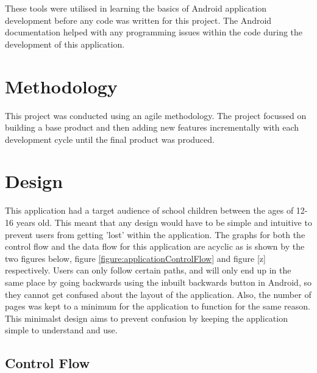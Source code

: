 \documentclass{article}
\begin{document}
These tools were utilised in learning the basics of Android application development before any code was written for this project. The Android documentation helped with any programming issues within the code during the development of this application. 

\section{Methodology}
\label{section:methodology}

This project was conducted using an agile methodology. The project focussed on building a base product and then adding new features incrementally with each development cycle until the final product was produced. 
























\section{Design}
\label{section:design}

This application had a target audience of school children between the ages of 12-16 years old. This meant that any design would have to be simple and intuitive to prevent users from getting 'lost' within the application. The graphs for both the control flow and the data flow for this application are acyclic as is shown by the two figures below, figure \ref{figure:applicationControlFlow} and figure [z] respectively. Users can only follow certain paths, and will only end up in the same place by going backwards using the inbuilt backwards button in Android, so they cannot get confused about the layout of the application. Also, the number of pages was kept to a minimum for the application to function for the same reason. This minimalst design aims to prevent confusion by keeping the application simple to understand and use. \par

\subsection{Control Flow}
\end{document}

